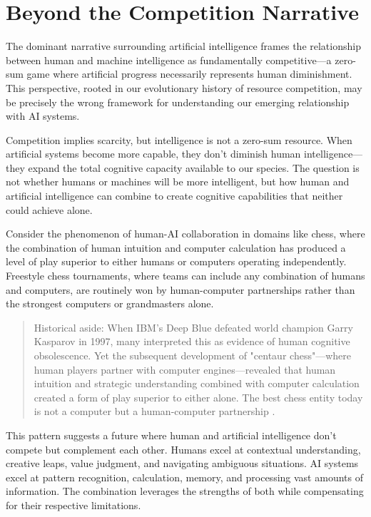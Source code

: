 \section{Beyond the Competition Narrative}

The dominant narrative surrounding artificial intelligence frames the relationship between human and machine intelligence as fundamentally competitive—a zero-sum game where artificial progress necessarily represents human diminishment. This perspective, rooted in our evolutionary history of resource competition, may be precisely the wrong framework for understanding our emerging relationship with AI systems.

Competition implies scarcity, but intelligence is not a zero-sum resource. When artificial systems become more capable, they don't diminish human intelligence—they expand the total cognitive capacity available to our species. The question is not whether humans or machines will be more intelligent, but how human and artificial intelligence can combine to create cognitive capabilities that neither could achieve alone.

Consider the phenomenon of human-AI collaboration in domains like chess, where the combination of human intuition and computer calculation has produced a level of play superior to either humans or computers operating independently. Freestyle chess tournaments, where teams can include any combination of humans and computers, are routinely won by human-computer partnerships rather than the strongest computers or grandmasters alone.

\begin{quote}\small
Historical aside: When IBM's Deep Blue defeated world champion Garry Kasparov in 1997, many interpreted this as evidence of human cognitive obsolescence. Yet the subsequent development of "centaur chess"—where human players partner with computer engines—revealed that human intuition and strategic understanding combined with computer calculation created a form of play superior to either alone. The best chess entity today is not a computer but a human-computer partnership \parencite{kasparov2017deep}.
\end{quote}

This pattern suggests a future where human and artificial intelligence don't compete but complement each other. Humans excel at contextual understanding, creative leaps, value judgment, and navigating ambiguous situations. AI systems excel at pattern recognition, calculation, memory, and processing vast amounts of information. The combination leverages the strengths of both while compensating for their respective limitations.

